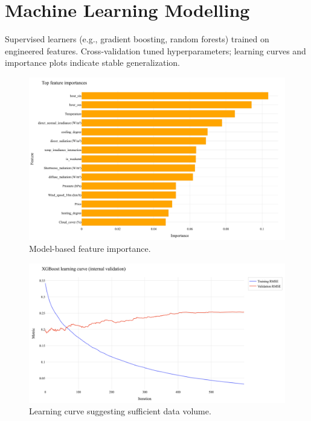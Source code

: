 \documentclass[12pt,a4paper]{article}
\begin{document}
\section{Machine Learning Modelling}
Supervised learners (e.g., gradient boosting, random forests) trained on engineered features. Cross-validation tuned hyperparameters; learning curves and importance plots indicate stable generalization.

\begin{figure}[H]
  \centering
  \includegraphics[width=\linewidth]{ml_feat_importance.png}
  \caption{Model-based feature importance.}
  \label{fig:ml_feat_importance}
\end{figure}

\begin{figure}[H]
  \centering
  \includegraphics[width=\linewidth]{ml_learning_curve.png}
  \caption{Learning curve suggesting sufficient data volume.}
  \label{fig:ml_learning}
\end{figure}
\end{document}
